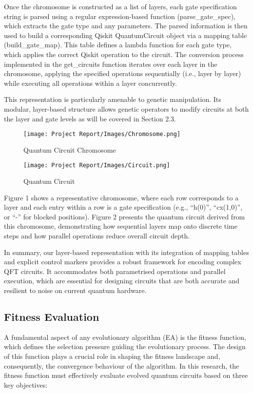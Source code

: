 \documentclass[11pt,a4paper]{article}
\begin{document}
Once the chromosome is constructed as a list of layers, each gate specification string is parsed using a regular expression-based function (parse\_gate\_spec), which extracts the gate type and any parameters. The parsed information is then used to build a corresponding Qiskit QuantumCircuit object via a mapping table (build\_gate\_map). This table defines a lambda function for each gate type, which applies the correct Qiskit operation to the circuit. The conversion process implemented in the get\_circuits function iterates over each layer in the chromosome, applying the specified operations sequentially (i.e., layer by layer) while executing all operations within a layer concurrently.\newline

This representation is particularly amenable to genetic manipulation. Its modular, layer-based structure allows genetic operators to modify circuits at both the layer and gate levels as will be covered in Section 2.3.\newline

\begin{figure}[H]
    \centering
    \texttt{[image: Project Report/Images/Chromosome.png]}
    \caption{Quantum Circuit Chromosome}
\end{figure}

\begin{figure}[H]
    \centering
    \texttt{[image: Project Report/Images/Circuit.png]}
    \caption{Quantum Circuit}
\end{figure}

Figure 1 shows a representative chromosome, where each row corresponds to a layer and each entry within a row is a gate specification (e.g., “h(0)”, “cx(1,0)”, or “-” for blocked positions). Figure 2 presents the quantum circuit derived from this chromosome, demonstrating how sequential layers map onto discrete time steps and how parallel operations reduce overall circuit depth.\newline

In summary, our layer-based representation with its integration of mapping tables and explicit control markers provides a robust framework for encoding complex QFT circuits. It accommodates both parametrised operations and parallel execution, which are essential for designing circuits that are both accurate and resilient to noise on current quantum hardware.

\subsection{Fitness Evaluation}
A fundamental aspect of any evolutionary algorithm (EA) is the fitness function, which defines the selection pressure guiding the evolutionary process. The design of this function plays a crucial role in shaping the fitness landscape and, consequently, the convergence behaviour of the algorithm. In this research, the fitness function must effectively evaluate evolved quantum circuits based on three key objectives:
\end{document}
